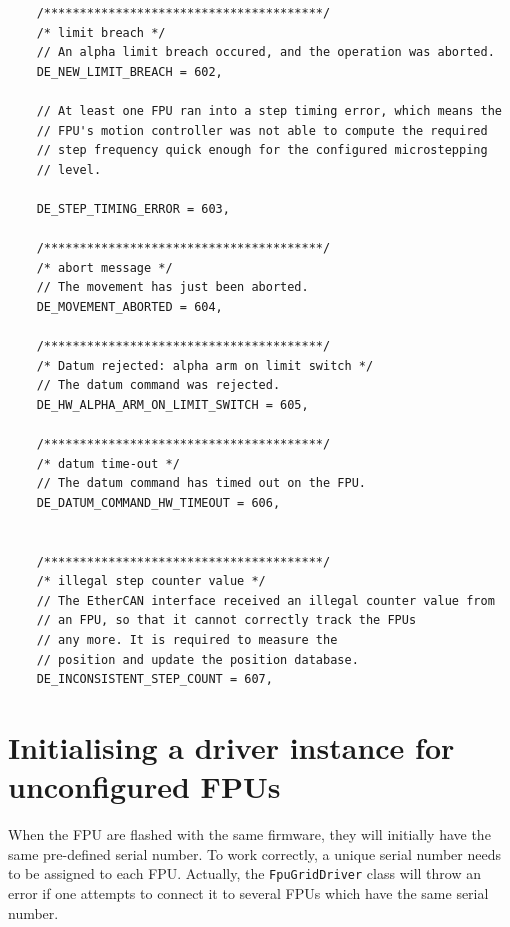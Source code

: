 \documentclass[fontsize=12,a4paper]{scrreprt}
\begin{document}
\begin{verbatim}
    /***************************************/
    /* limit breach */
    // An alpha limit breach occured, and the operation was aborted.
    DE_NEW_LIMIT_BREACH = 602,

    // At least one FPU ran into a step timing error, which means the
    // FPU's motion controller was not able to compute the required
    // step frequency quick enough for the configured microstepping
    // level.

    DE_STEP_TIMING_ERROR = 603,

    /***************************************/
    /* abort message */
    // The movement has just been aborted.
    DE_MOVEMENT_ABORTED = 604,

    /***************************************/
    /* Datum rejected: alpha arm on limit switch */
    // The datum command was rejected.
    DE_HW_ALPHA_ARM_ON_LIMIT_SWITCH = 605,

    /***************************************/
    /* datum time-out */
    // The datum command has timed out on the FPU.
    DE_DATUM_COMMAND_HW_TIMEOUT = 606,


    /***************************************/
    /* illegal step counter value */
    // The EtherCAN interface received an illegal counter value from
    // an FPU, so that it cannot correctly track the FPUs
    // any more. It is required to measure the
    // position and update the position database.
    DE_INCONSISTENT_STEP_COUNT = 607,

\end{verbatim}


\chapter{Initialising a driver instance for unconfigured FPUs}

%
%
%
%
%
%


When the FPU are flashed with the same firmware, they will initially
have the same pre-defined serial number. To work correctly, a unique
serial number needs to be assigned to each FPU.  Actually, the
\texttt{FpuGridDriver} class will throw an error if one attempts to
connect it to several FPUs which have the same serial number.
\end{document}
